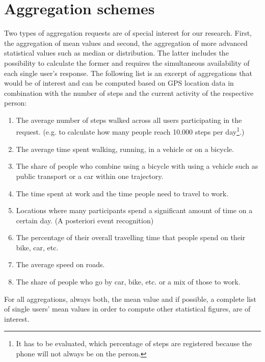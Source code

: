  \section{Aggregation schemes}\label{aggregation-schemes}
 Two types of aggregation requests are of special interest for our research. First, the aggregation of mean values and second, the aggregation of more advanced statistical values such as median or distribution. The latter includes the possibility to calculate the former and requires the simultaneous availability of each single user's response. %
 The following list is an excerpt of aggregations that would be of interest and can be computed based on GPS location data in combination with the number of steps and the current activity of the respective person:
 \begin{enumerate}
 	\item The average number of steps walked across all users participating in the request. (e.g. to calculate how many people reach 10.000 steps per day\footnote{It has to be evaluated, which percentage of steps are registered because the phone will not always be on the person.}.)
	\item The average time spent walking, running, in a vehicle or on a bicycle.
	\item The share of people who combine using a bicycle with using a vehicle such as public transport or a car within one trajectory.
	\item The time spent at work and the time people need to travel to work.
	\item Locations where many participants spend a significant amount of time on a certain day. (A posteriori event recognition)
	\item The percentage of their overall travelling time that people spend on their bike, car, etc.
	\item The average speed on roads.
	\item The share of people who go by car, bike, etc. or a mix of those to work.


 \end{enumerate}
 For all aggregations, always both, the mean value and if possible, a complete list of single users' mean values in order to compute other statistical figures, are of interest.

